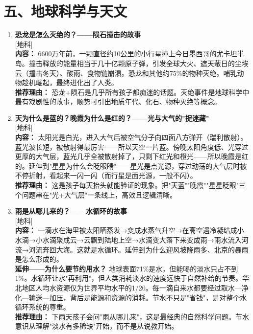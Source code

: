 \documentclass[a4paper,12pt]{ctexart}
\newcommand{\tagearth}{\textcolor{earth}{\small [地科]}}
\begin{document}
\section*{\textcolor{orange!80!black}{五、地球科学与天文}}

\begin{enumerate}

\item[\textbf{第24课}] \textbf{恐龙是怎么灭绝的？——陨石撞击的故事} \\
\tagearth \\
\textbf{内容：} 6600万年前，一颗直径约10公里的小行星撞上今日墨西哥的尤卡坦半岛。撞击释放的能量相当于几十亿颗原子弹，引发全球大火、遮天蔽日的尘埃云（撞击冬天）、酸雨、食物链崩溃。恐龙和其他约75\%的物种灭绝。哺乳动物趁机崛起，最终进化出了人类。\\
\textbf{推荐理由：} 恐龙+陨石是几乎所有孩子都痴迷的话题。灭绝事件是地球科学中最有戏剧性的故事，顺势可引出地质年代、化石、物种灭绝等概念。

\item[\textbf{第25课}] \textbf{天为什么是蓝的？晚霞为什么是红的？——光与大气的"捉迷藏"} \\
\tagearth \\
\textbf{内容：} 太阳光是白光，进入大气后被空气分子向四面八方弹开（瑞利散射）。蓝光波长短，被散射得最厉害——所以天空一片蓝。傍晚太阳角度低、光穿过更厚的大气层，蓝光几乎全被散射掉了，只剩下红光和橙光——所以晚霞是红的。延伸到"星星为什么会眨眼睛"——星光是点光源，穿过动荡的大气层时被不停折射，看起来一闪一闪（而行星是面光源，一般不闪）。\\
\textbf{推荐理由：} 这是孩子每天抬头就能验证的现象。把"天蓝""晚霞""星星眨眼"三个问题串在"光+大气层"一条线上，高效且逻辑清晰。

\item[\textbf{第26课}] \textbf{雨是从哪儿来的？——水循环的故事} \\
\tagearth \\
\textbf{内容：} 一滴水在海里被太阳晒蒸发→变成水蒸气升空→在高空遇冷凝结成小水滴→小水滴聚成云→云飘到陆地上空→水滴变大落下来变成雨→雨水流入河流→河流奔回大海。这就是水循环。延伸到为什么迎风坡降雨多、北京的暴雨是怎么形成的。\\
\textbf{延伸——为什么要节约用水？} 地球表面71\%是水，但能喝的淡水只占不到1\%。水循环让水"再利用"，但人类消耗淡水的速度远快于自然补给的节奏。华北地区人均水资源仅为世界平均水平的1/20。每一滴自来水都要经过取水—净化—输送—加压，背后是能源和资源的消耗。节水不只是"省钱"，是对整个水循环系统的尊重。\\
\textbf{推荐理由：} 下雨天孩子会问"雨从哪儿来"，这是最经典的自然科学问题。节水意识从理解"淡水有多稀缺"开始，而不是从说教开始。


\end{enumerate}
\end{document}
